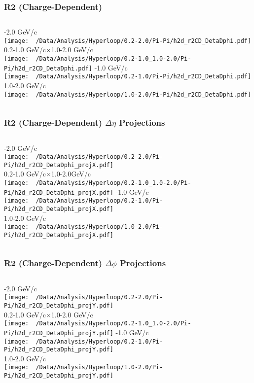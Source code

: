 \documentclass{beamer}
\begin{document}
\begin{frame}
	\frametitle{R2 (Charge-Dependent)}
	\begin{columns}
		-2.0 GeV/c\\
		\texttt{[image: ~/Data/Analysis/Hyperloop/0.2-2.0/Pi-Pi/h2d\_r2CD\_DetaDphi.pdf]}\\0.2-1.0 GeV/c$\times$1.0-2.0 GeV/c\\
		\texttt{[image: ~/Data/Analysis/Hyperloop/0.2-1.0\_1.0-2.0/Pi-Pi/h2d\_r2CD\_DetaDphi.pdf]}
		-1.0 GeV/c\\
		\texttt{[image: ~/Data/Analysis/Hyperloop/0.2-1.0/Pi-Pi/h2d\_r2CD\_DetaDphi.pdf]}\\1.0-2.0 GeV/c\\
		\texttt{[image: ~/Data/Analysis/Hyperloop/1.0-2.0/Pi-Pi/h2d\_r2CD\_DetaDphi.pdf]}
	\end{columns}
\end{frame}
\begin{frame}
	\frametitle{R2 (Charge-Dependent) $\Delta\eta$ Projections}
	\begin{columns}
		\column{0.5\textwidth}
		-2.0 GeV/c\\
		\texttt{[image: ~/Data/Analysis/Hyperloop/0.2-2.0/Pi-Pi/h2d\_r2CD\_DetaDphi\_projX.pdf]}\\0.2-1.0 GeV/c$\times$1.0-2.0GeV/c\\
		\texttt{[image: ~/Data/Analysis/Hyperloop/0.2-1.0\_1.0-2.0/Pi-Pi/h2d\_r2CD\_DetaDphi\_projX.pdf]}
		\column{0.5\textwidth}
		-1.0 GeV/c\\
		\texttt{[image: ~/Data/Analysis/Hyperloop/0.2-1.0/Pi-Pi/h2d\_r2CD\_DetaDphi\_projX.pdf]}\\1.0-2.0 GeV/c\\
		\texttt{[image: ~/Data/Analysis/Hyperloop/1.0-2.0/Pi-Pi/h2d\_r2CD\_DetaDphi\_projX.pdf]}
	\end{columns}
\end{frame}
\begin{frame}
	\frametitle{R2 (Charge-Dependent) $\Delta\phi$ Projections}
	\begin{columns}
		-2.0 GeV/c\\
		\texttt{[image: ~/Data/Analysis/Hyperloop/0.2-2.0/Pi-Pi/h2d\_r2CD\_DetaDphi\_projY.pdf]}\\0.2-1.0 GeV/c$\times$1.0-2.0 GeV/c\\
		\texttt{[image: ~/Data/Analysis/Hyperloop/0.2-1.0\_1.0-2.0/Pi-Pi/h2d\_r2CD\_DetaDphi\_projY.pdf]}
		-1.0 GeV/c\\
		\texttt{[image: ~/Data/Analysis/Hyperloop/0.2-1.0/Pi-Pi/h2d\_r2CD\_DetaDphi\_projY.pdf]}\\1.0-2.0 GeV/c\\
		\texttt{[image: ~/Data/Analysis/Hyperloop/1.0-2.0/Pi-Pi/h2d\_r2CD\_DetaDphi\_projY.pdf]}
	\end{columns}
\end{frame}
\end{document}

